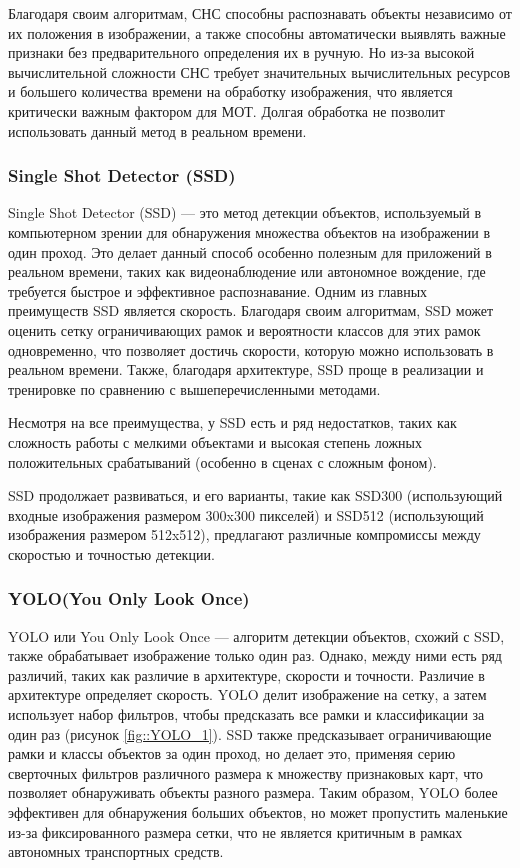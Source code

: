 Благодаря своим алгоритмам, СНС способны распознавать объекты независимо от их положения в изображении, а также способны автоматически выявлять важные признаки без предварительного определения их в ручную. Но из-за высокой вычислительной сложности СНС требует значительных вычислительных ресурсов и большего количества времени на обработку изображения, что является критически важным фактором для МОТ. Долгая обработка не позволит использовать данный метод в реальном времени.

\subsubsection{Single Shot Detector (SSD)}

Single Shot Detector (SSD) --- это метод детекции объектов, используемый в компьютерном зрении для обнаружения множества объектов на изображении в один проход. Это делает данный способ особенно полезным для приложений в реальном времени, таких как видеонаблюдение или автономное вождение, где требуется быстрое и эффективное распознавание. Одним из главных преимуществ SSD является скорость. Благодаря своим алгоритмам, SSD может оценить сетку ограничивающих рамок и вероятности классов для этих рамок одновременно, что позволяет достичь скорости, которую можно использовать в реальном времени. Также, благодаря архитектуре, SSD проще в реализации и тренировке по сравнению с вышеперечисленными методами.

Несмотря на все преимущества, у SSD есть и ряд недостатков, таких как сложность работы с мелкими объектами и высокая степень ложных положительных срабатываний (особенно в сценах с сложным фоном).

SSD продолжает развиваться, и его варианты, такие как SSD300 (использующий входные изображения размером 300x300 пикселей) и SSD512 (использующий изображения размером 512x512), предлагают различные компромиссы между скоростью и точностью детекции.

\subsubsection{YOLO(You Only Look Once)}

YOLO или You Only Look Once --- алгоритм детекции объектов, схожий с SSD, также обрабатывает изображение только один раз. Однако, между ними есть ряд различий, таких как различие в архитектуре, скорости и точности. Различие в архитектуре определяет скорость. YOLO делит изображение на сетку, а затем использует набор фильтров, чтобы предсказать все рамки и классификации за один раз (рисунок \ref{fig::YOLO_1}). SSD также предсказывает ограничивающие рамки и классы объектов за один проход, но делает это, применяя серию сверточных фильтров различного размера к множеству признаковых карт, что позволяет обнаруживать объекты разного размера. Таким образом, YOLO более эффективен для обнаружения больших объектов, но может пропустить маленькие из-за фиксированного размера сетки, что не является критичным в рамках автономных транспортных средств. 

